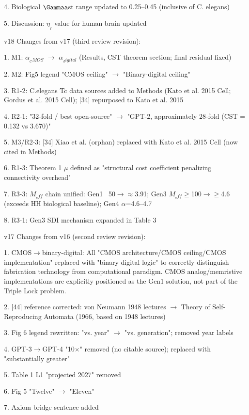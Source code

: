 \documentclass[a4paper,12pt]{article}
\begin{document}
4. Biological $\Gammaa$st range updated to 0.25--0.45 (inclusive of C. elegans)

5. Discussion: $\eta_{_I}$ value for human brain updated

v18 Changes from v17 (third review revision):

1. M1: $\alpha_{_CMOS}$ $\rightarrow$ $\alpha_{_digital}$ (Results, CST theorem section; final residual fixed)

2. M2: Fig5 legend "CMOS ceiling" $\rightarrow$ "Binary-digital ceiling"

3. R1-2: C.elegans Tc data sources added to Methods (Kato et al. 2015 Cell; Gordus et al. 2015 Cell); [34] repurposed to Kato et al. 2015

4. R2-1: "32-fold / best open-source" $\rightarrow$ "GPT-2, approximately 28-fold (CST = 0.132 vs 3.670)"

5. M3/R2-3: [34] Xiao et al. (orphan) replaced with Kato et al. 2015 Cell (now cited in Methods)

6. R1-3: Theorem 1 $\mu$ defined as "structural cost coefficient penalizing connectivity overhead"

7. R3-3: $M_{_eff}$ chain unified: Gen1 ~50$\rightarrow$\alpha$\approx$3.91; Gen3 $M_{_eff}$$\geq$100$\rightarrow$\alpha$\geq$4.6 (exceeds HH biological baseline); Gen4 $\alpha$=4.6--4.7

8. R3-1: Gen3 SDI mechanism expanded in Table 3

v17 Changes from v16 (second review revision):

1. CMOS$\rightarrow$binary-digital: All "CMOS architecture/CMOS ceiling/CMOS implementation" replaced with "binary-digital logic" to correctly distinguish fabrication technology from computational paradigm. CMOS analog/memristive implementations are explicitly positioned as the Gen1 solution, not part of the Triple Lock problem.

2. [44] reference corrected: von Neumann 1948 lectures $\rightarrow$ Theory of Self-Reproducing Automata (1966, based on 1948 lectures)

3. Fig 6 legend rewritten: "vs. year" $\rightarrow$ "vs. generation"; removed year labels

4. GPT-3$\rightarrow$GPT-4 "10$\times$" removed (no citable source); replaced with "substantially greater"

5. Table 1 L1 "projected 2027" removed

6. Fig 5 "Twelve" $\rightarrow$ "Eleven"

7. Axiom bridge sentence added
\end{document}
